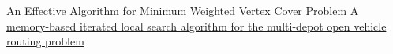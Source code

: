 \documentclass[11pt]{article}
\begin{document}
\pagebreak

\begin{thebibliography}{5}


 \href{https://www.researchgate.net/publication/242463011_An_Effective_Algorithm_for_Minimum_Weighted_Vertex_Cover_problem}{An Effective Algorithm for Minimum Weighted Vertex Cover Problem}
 \href{https://www.sciencedirect.com/science/article/abs/pii/S0377221720300278}{A memory-based iterated local search algorithm for the multi-depot open vehicle routing problem}

\end{thebibliography}


\pagebreak
\end{document}
